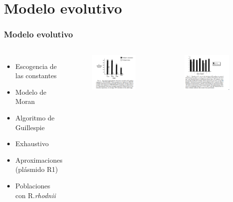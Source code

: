 \documentclass{beamer}
\begin{document}
\section{Modelo evolutivo}


\begin{frame}
\frametitle{Modelo evolutivo}
\begin{columns}[c] %
\begin{itemize}
\item Escogencia de las constantes
\item Modelo de Moran
\item Algoritmo de Guillespie
\item Exhaustivo
\item Aproximaciones (plásmido R1)
\item Poblaciones con R.\textit{rhodnii}
\end{itemize}


\begin{figure}[ht!]
\vspace*{-1cm}
\includegraphics[scale=0.4]{supervivencia.png} 
\end{figure}

\begin{figure}[ht!]
\vspace*{-1cm}
\includegraphics[scale=0.4]{super_parasitos.png} 
\end{figure}





\end{columns}
\end{frame}
\end{document}
